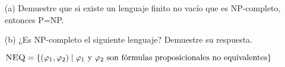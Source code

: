 \begin{enumerate}
	\item[(a)] Demuestre que si existe un lenguaje finito no vacío que es NP-completo, entonces P=NP.
	\item[(b)] ¿Es NP-completo el siguiente lenguaje? Demuestre su respuesta.
	\begin{center}
		$\textsc{NEQ}=\{(\varphi_1,\varphi_2)\mid\varphi_1\text{ y }\varphi_2\text{ son fórmulas proposicionales no equivalentes}\}$
	\end{center} 

\end{enumerate}
